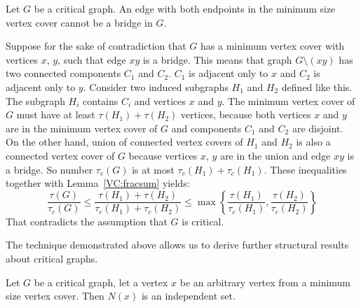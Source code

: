 \begin{lemma}\label{VC:Bridge}
Let \(G\) be a critical graph. An edge with both endpoints in the minimum size vertex cover cannot be a bridge in \(G\).
\end{lemma}
\begin{myproof}
	Suppose for the sake of contradiction that \(G\) has a minimum vertex cover with vertices \(x\), \(y\), such that edge \(xy\) is a bridge.
	This means that graph \(G \setminus (xy)\) has two connected components \(C_1\) and \(C_2\).
	\(C_1\) is adjacent only to \(x\) and \(C_2\) is adjacent only to \(y\).
	Consider two induced subgraphs \(H_1\) and \(H_2\) defined like this.
	The subgraph \(H_i\) contains \(C_i\) and vertices \(x\) and \(y\).
	The minimum vertex cover of \(G\) must have at least \(\tau(H_1) + \tau(H_2)\) vertices, because both vertices \(x\) and \(y\)  %
	are in the minimum vertex cover of \(G\) and components \(C_1\) and \(C_2\) are disjoint.
	On the other hand, union of connected vertex covers of \(H_1\) and \(H_2\) is also a connected vertex cover of \(G\) because vertices \(x\), \(y\) are in the union
	and edge \(xy\) is a bridge.
	So number \(\tau_c(G)\) is at most \(\tau_c(H_1) + \tau_c(H_1)\).
	These inequalities together with Lemma~\ref{VC:fracsum} yields:
	\[{\frac{\tau(G)}{\tau_c(G)}} \leq {\frac{\tau(H_1) + \tau(H_2)}{\tau_c(H_1) + \tau_c(H_2)}} \leq {\max\left\{\frac{\tau(H_1)}{\tau_c(H_1)}, \frac{\tau(H_2)}{\tau_c(H_2)}\right\}}\]
	That contradicts the assumption that \(G\) is critical.
\end{myproof}

The technique demonstrated above allows us to derive further structural results about critical graphs.

\begin{lemma}\label{VC:IndNeig}
Let \(G\) be a critical graph, let a vertex \(x\) be an arbitrary vertex from a minimum size vertex cover. Then \(N(x)\) is an independent set.
\end{lemma}

